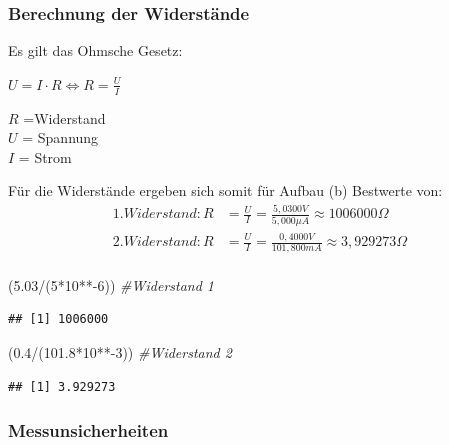 \documentclass[class=article, crop=false]{standalone}
\newenvironment{Shaded}{\begin{snugshade}}{\end{snugshade}}
\newcommand{\CommentTok}[1]{\textcolor[rgb]{0.56,0.35,0.01}{\textit{#1}}}
\newcommand{\DecValTok}[1]{\textcolor[rgb]{0.00,0.00,0.81}{#1}}
\newcommand{\FloatTok}[1]{\textcolor[rgb]{0.00,0.00,0.81}{#1}}
\newcommand{\NormalTok}[1]{#1}
\newcommand{\SpecialCharTok}[1]{\textcolor[rgb]{0.00,0.00,0.00}{#1}}
\begin{document}
\hypertarget{berechnung-der-widerstuxe4nde-1}{%
\subsubsection{Berechnung der
Widerstände}\label{berechnung-der-widerstuxe4nde-1}}

Es gilt das Ohmsche Gesetz:

\(U=I\cdot R \Leftrightarrow R = \frac{U}{I}\)

\noindent \(R\) =Widerstand\\
\noindent \(U\) = Spannung\\
\noindent \(I\) = Strom

Für die Widerstände ergeben sich somit für Aufbau (b) Bestwerte von:
\begin{equation*}
\begin{split}
1. Widerstand: R&=\frac{U}{I} = \frac {5,0300V}{5,000 \mu A} \approx 1006000 \Omega \\
2.Widerstand: R&=\frac{U}{I} = \frac {0,4000V}{101,800 mA} \approx 3,929273 \Omega \\
\end{split}
\end{equation*}

\begin{Shaded}
\begin{Highlighting}[]
\NormalTok{(}\FloatTok{5.03}\SpecialCharTok{/}\NormalTok{(}\DecValTok{5}\SpecialCharTok{*}\DecValTok{10}\SpecialCharTok{**{-}}\DecValTok{6}\NormalTok{)) }\CommentTok{\#Widerstand 1}
\end{Highlighting}
\end{Shaded}

\begin{verbatim}
## [1] 1006000
\end{verbatim}

\begin{Shaded}
\begin{Highlighting}[]
\NormalTok{(}\FloatTok{0.4}\SpecialCharTok{/}\NormalTok{(}\FloatTok{101.8}\SpecialCharTok{*}\DecValTok{10}\SpecialCharTok{**{-}}\DecValTok{3}\NormalTok{)) }\CommentTok{\#Widerstand 2}
\end{Highlighting}
\end{Shaded}

\begin{verbatim}
## [1] 3.929273
\end{verbatim}

\hypertarget{messunsicherheiten-1}{%
\subsubsection{Messunsicherheiten}\label{messunsicherheiten-1}}
\end{document}
